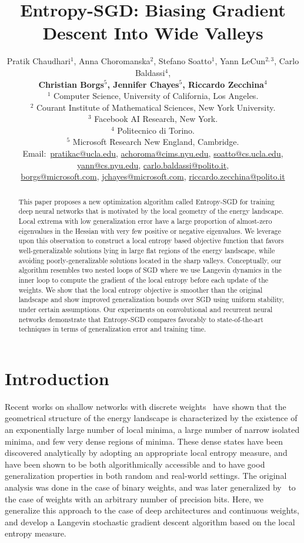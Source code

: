 \documentclass[10pt]{article}
\title{Entropy-SGD: Biasing Gradient Descent Into Wide Valleys}
\author{Pratik Chaudhari$^{1}$, Anna Choromanska$^{2}$, Stefano Soatto$^{1}$, Yann LeCun$^{2,3}$, Carlo Baldassi$^{4}$,\\[0.03in]
\textbf{Christian Borgs$^{5}$, Jennifer Chayes$^{5}$, 
Riccardo Zecchina$^{4}$}\\[0.05in]
$^{1}$ Computer Science, University of California, Los Angeles.\\
$^{2}$ Courant Institute of Mathematical Sciences, New York University.\\
$^{3}$ Facebook AI Research, New York.\\
$^{4}$ Politecnico di Torino.\\
$^{5}$ Microsoft Research New England, Cambridge.\\ [0.05in]
{\footnotesize
Email:\ \href{mailto:pratikac@ucla.edu}{pratikac@ucla.edu},
\href{mailto:achoroma@cims.nyu.edu}{achoroma@cims.nyu.edu},
\href{mailto:soatto@cs.ucla.edu}{soatto@cs.ucla.edu},
\href{mailto:yann@cs.nyu.edu}{yann@cs.nyu.edu},
\href{mailto:carlo.baldassi@polito.it}{carlo.baldassi@polito.it},}\\[0.03in]
{\footnotesize
\hspace{0.33in} \href{mailto:borgs@microsoft.com}{borgs@microsoft.com},
\href{mailto:jchayes@microsoft.com}{jchayes@microsoft.com},
\href{mailto:riccardo.zecchina@polito.it}{riccardo.zecchina@polito.it}
}}
\newcommand{\pc}[2]{{\color{ForestGreen}#1}\marginpar{\tiny\noindent{\raggedright{\color{Sienna}[PC]}\color{Sienna}{#2} \par}}}
\newcommand{\todo}[1]{{\color{gray}#1}\marginpar{\tiny\noindent{\raggedright{\color{blue}[TODO]}}}}
\begin{document}
\maketitle

\begin{abstract}
This paper proposes a new optimization algorithm called Entropy-SGD for training deep neural networks that is motivated by the local geometry of the energy landscape. Local extrema with low generalization error have a large proportion of almost-zero eigenvalues in the Hessian with very few positive or negative eigenvalues. We leverage upon this observation to construct a local entropy based objective function that favors well-generalizable solutions lying in large flat regions of the energy landscape, while avoiding poorly-generalizable solutions located in the sharp valleys. Conceptually, our algorithm resembles two nested loops of SGD where we use Langevin dynamics in the inner loop to compute the gradient of the local entropy before each update of the weights. We show that the local entropy objective is smoother than the original landscape and show improved generalization bounds over SGD using uniform stability, \pc{under certain assumptions}{}. Our experiments on convolutional and recurrent neural networks demonstrate that Entropy-SGD compares favorably to state-of-the-art techniques in terms of generalization error and training time.
\end{abstract}

\section{Introduction}
\label{s:intro}

\todo{Recent works on shallow networks with discrete weights~\citep{baldassi2015subdominant,baldassi2016unreasonable} have shown that the geometrical structure of the energy landscape is characterized by the existence of an exponentially large number of local minima, a large number of narrow isolated minima, and few very dense regions of minima. These dense states have been discovered analytically by adopting an appropriate local entropy measure, and have been shown to be both algorithmically accessible and to have good generalization properties in both random and real-world settings. The original analysis was done in the case of binary weights, and was later generalized by~\citet{baldassi2016multilevel} to the case of weights with an arbitrary number of precision bits. Here, we generalize this approach to the case of deep architectures and continuous weights, and develop a Langevin stochastic gradient descent algorithm based on the local entropy measure.}
\end{document}
